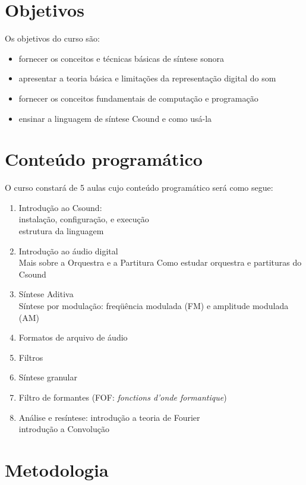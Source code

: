 \documentclass[12pt,brazil]{article}
\begin{document}
\section{Objetivos}

Os objetivos do curso são:

\begin{itemize}
\item fornecer os conceitos e técnicas básicas de síntese sonora 
\item apresentar a teoria básica e limitações da representação digital
  do som
\item fornecer os conceitos fundamentais de computação e programação
\item ensinar a linguagem de síntese Csound e como usá-la
\end{itemize}

\section{Conteúdo programático} 

O curso constará de 5 aulas cujo conteúdo programático será como
segue:

\begin{enumerate}
\item Introdução ao Csound: \\
  instalação, configuração, e execução \\
  estrutura da linguagem
\item Introdução ao áudio digital \\
  Mais sobre a Orquestra e a Partitura
  Como estudar orquestra e partituras do Csound
\item Síntese Aditiva \\
  Síntese por modulação: freqüência modulada (FM) e amplitude modulada (AM)
\item Formatos de arquivo de áudio
\item Filtros
\item Síntese granular
\item Filtro de formantes (FOF: \textit{fonctions d'onde formantique})
\item Análise e resíntese:
  introdução a teoria de Fourier \\
  introdução a Convolução \\
\end{enumerate} 

\section{Metodologia}
\end{document}
